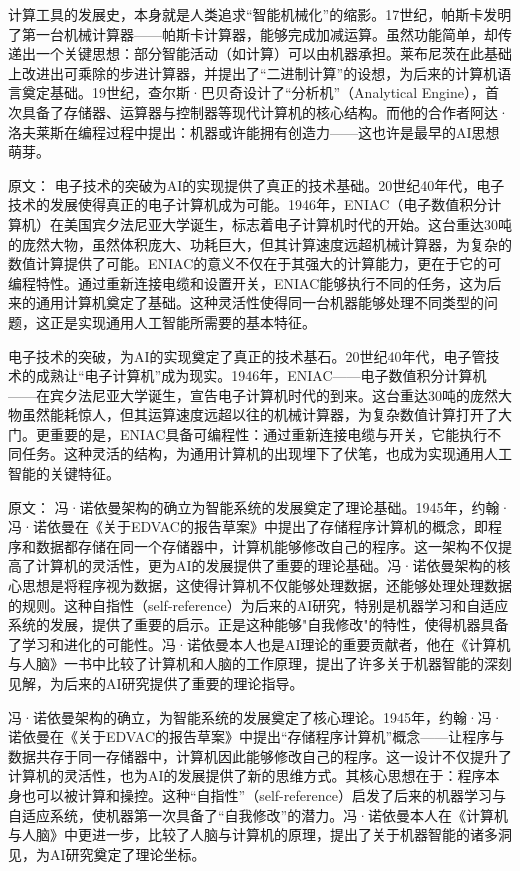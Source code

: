 计算工具的发展史，本身就是人类追求“智能机械化”的缩影。17世纪，帕斯卡发明了第一台机械计算器——帕斯卡计算器，能够完成加减运算。虽然功能简单，却传递出一个关键思想：部分智能活动（如计算）可以由机器承担。莱布尼茨在此基础上改进出可乘除的步进计算器，并提出了“二进制计算”的设想，为后来的计算机语言奠定基础。19世纪，查尔斯·巴贝奇设计了“分析机”（Analytical Engine），首次具备了存储器、运算器与控制器等现代计算机的核心结构。而他的合作者阿达·洛夫莱斯在编程过程中提出：机器或许能拥有创造力——这也许是最早的AI思想萌芽。

原文：
电子技术的突破为AI的实现提供了真正的技术基础。20世纪40年代，电子技术的发展使得真正的电子计算机成为可能。1946年，ENIAC（电子数值积分计算机）在美国宾夕法尼亚大学诞生，标志着电子计算机时代的开始。这台重达30吨的庞然大物，虽然体积庞大、功耗巨大，但其计算速度远超机械计算器，为复杂的数值计算提供了可能。ENIAC的意义不仅在于其强大的计算能力，更在于它的可编程特性。通过重新连接电缆和设置开关，ENIAC能够执行不同的任务，这为后来的通用计算机奠定了基础。这种灵活性使得同一台机器能够处理不同类型的问题，这正是实现通用人工智能所需要的基本特征。

电子技术的突破，为AI的实现奠定了真正的技术基石。20世纪40年代，电子管技术的成熟让“电子计算机”成为现实。1946年，ENIAC——电子数值积分计算机——在宾夕法尼亚大学诞生，宣告电子计算机时代的到来。这台重达30吨的庞然大物虽然能耗惊人，但其运算速度远超以往的机械计算器，为复杂数值计算打开了大门。更重要的是，ENIAC具备可编程性：通过重新连接电缆与开关，它能执行不同任务。这种灵活的结构，为通用计算机的出现埋下了伏笔，也成为实现通用人工智能的关键特征。

原文：
冯·诺依曼架构的确立为智能系统的发展奠定了理论基础。1945年，约翰·冯·诺依曼在《关于EDVAC的报告草案》中提出了存储程序计算机的概念，即程序和数据都存储在同一个存储器中，计算机能够修改自己的程序。这一架构不仅提高了计算机的灵活性，更为AI的发展提供了重要的理论基础。冯·诺依曼架构的核心思想是将程序视为数据，这使得计算机不仅能够处理数据，还能够处理处理数据的规则。这种自指性（self-reference）为后来的AI研究，特别是机器学习和自适应系统的发展，提供了重要的启示。正是这种能够"自我修改"的特性，使得机器具备了学习和进化的可能性。冯·诺依曼本人也是AI理论的重要贡献者，他在《计算机与人脑》一书中比较了计算机和人脑的工作原理，提出了许多关于机器智能的深刻见解，为后来的AI研究提供了重要的理论指导。

冯·诺依曼架构的确立，为智能系统的发展奠定了核心理论。1945年，约翰·冯·诺依曼在《关于EDVAC的报告草案》中提出“存储程序计算机”概念——让程序与数据共存于同一存储器中，计算机因此能够修改自己的程序。这一设计不仅提升了计算机的灵活性，也为AI的发展提供了新的思维方式。其核心思想在于：程序本身也可以被计算和操控。这种“自指性”（self-reference）启发了后来的机器学习与自适应系统，使机器第一次具备了“自我修改”的潜力。冯·诺依曼本人在《计算机与人脑》中更进一步，比较了人脑与计算机的原理，提出了关于机器智能的诸多洞见，为AI研究奠定了理论坐标。

